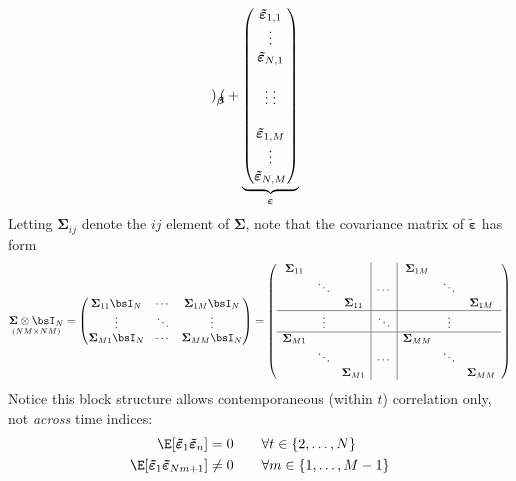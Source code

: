 \documentclass[12pt]{article}
\theoremstyle{plain}
\theoremstyle{definition}
\theoremstyle{remark}
\newcommand{\bsSigma}{\boldsymbol{\Sigma}}
\newcommand{\bsvarepsilon}{\boldsymbol{\varepsilon}}
\newcommand{\bsbeta}{\boldsymbol{\beta}}
\newcommand{\bstildevarepsilon}{\boldsymbol{\tilde{\varepsilon}}}
\begin{document}
\begin{align*}
{\begin{pmatrix}
    \end{pmatrix}
  }_{\bsbeta}
  +
  \underbrace{%
    \begin{pmatrix}
      \bstildevarepsilon_{1,1} \\ \vdots \\ \bstildevarepsilon_{N,1} \\\\
      \vdots\;\vdots\\\\
      \bstildevarepsilon_{1,M} \\ \vdots \\ \bstildevarepsilon_{N,M} \\
    \end{pmatrix}
  }_{\bsvarepsilon}
\end{align*}
Letting $\bsSigma_{ij}$ denote the $ij$ element of $\bsSigma$, note that
the covariance matrix of $\bstildevarepsilon$ has form
\begin{align*}
  \underset{(NM\times NM)}{\bsSigma\otimes \bsI_N}
  =
  \begin{pmatrix}
    \bsSigma_{11}\bsI_N & \cdots & \bsSigma_{1M}\bsI_N \\
    \vdots & \ddots & \vdots \\
    \bsSigma_{M1}\bsI_N & \cdots & \bsSigma_{MM}\bsI_N \\
  \end{pmatrix}
  =
  \left(
  \begin{array}{ccc|c|ccc}
  \bsSigma_{11} &        &             &  & \bsSigma_{1M} &          & \\
              & \ddots &             & \cdots &             & \ddots\\
              &        & \bsSigma_{11} & &             &          & \bsSigma_{1M}\\\hline
       & \vdots &       & \ddots &      & \vdots   & \\\hline
  \bsSigma_{M1} &        &             & & \bsSigma_{MM} &          & \\
              & \ddots &             & \cdots &             & \ddots\\
              &        & \bsSigma_{M1} & &             &          & \bsSigma_{MM}\\
  \end{array}
  \right)
\end{align*}
Notice this block structure allows contemporaneous (within $t$)
correlation only, not \emph{across} time indices:
\begin{align*}
  \E[\bstildevarepsilon_1\bstildevarepsilon_n]&=0
  \qquad\forall
  t\in\{2,\ldots,N\} \\
  \E[\bstildevarepsilon_1\bstildevarepsilon_{Nm+1}]&\neq 0
  \qquad \forall m\in\{1,\ldots,M-1\}
\end{align*}
\end{document}
